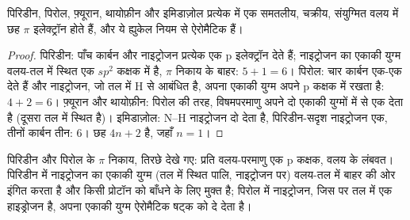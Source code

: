 \begin{proposition}[छह $\pi$ इलेक्ट्रॉन]\label{prop:b3:heterocycles:sextet}
पिरिडीन, पिरोल, फ़्यूरान, थायोफ़ीन और इमिडाज़ोल प्रत्येक में एक समतलीय, चक्रीय, संयुग्मित
वलय में छह $\pi$ इलेक्ट्रॉन होते हैं, और ये ह्युकेल नियम से ऐरोमैटिक हैं।
\end{proposition}

\begin{proof}
पिरिडीन: पाँच कार्बन और नाइट्रोजन प्रत्येक एक p इलेक्ट्रॉन देते हैं; नाइट्रोजन का
एकाकी युग्म वलय-तल में स्थित एक $sp^2$ कक्षक में है, $\pi$ निकाय के बाहर: $5 + 1 = 6$।
पिरोल: चार कार्बन एक-एक देते हैं और नाइट्रोजन, जो तल में H से आबंधित है,
अपना एकाकी युग्म अपने p कक्षक में रखता है: $4 + 2 = 6$। फ़्यूरान और थायोफ़ीन: पिरोल की तरह,
विषमपरमाणु अपने दो एकाकी युग्मों में से एक देता है (दूसरा तल में स्थित है)। इमिडाज़ोल:
N--H नाइट्रोजन दो देता है, पिरिडीन-सदृश नाइट्रोजन एक, तीनों कार्बन
तीन: 6। छह $4n + 2$ है, जहाँ $n = 1$।
\end{proof}

\begin{omfigure}

{\small पिरिडीन और पिरोल के $\pi$ निकाय, तिरछे देखे गए: प्रति वलय-परमाणु एक p कक्षक,
वलय के लंबवत। पिरिडीन में नाइट्रोजन का एकाकी युग्म (तल में स्थित पालि, नाइट्रोजन पर)
वलय-तल में बाहर की ओर इंगित करता है और किसी प्रोटॉन को बाँधने के लिए मुक्त है; पिरोल में
नाइट्रोजन, जिस पर तल में एक हाइड्रोजन है, अपना एकाकी युग्म ऐरोमैटिक
षट्क को दे देता है।}
\end{omfigure}

